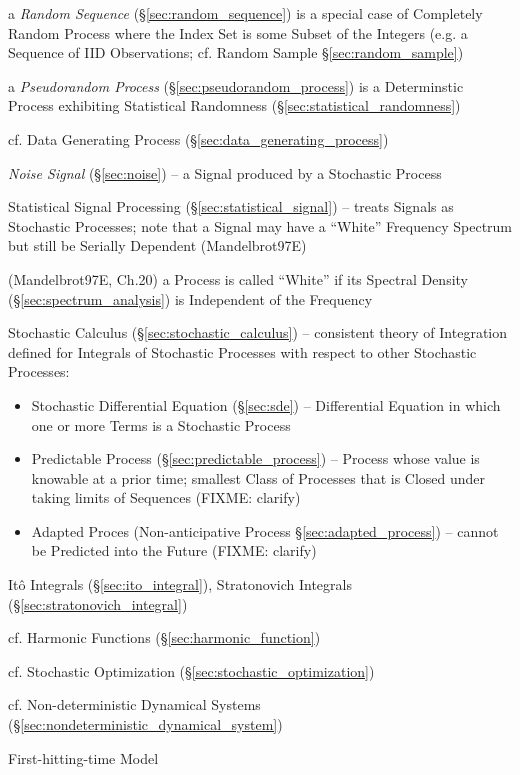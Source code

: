 \fist a \emph{Random Sequence} (\S\ref{sec:random_sequence}) is a special case
of Completely Random Process where the Index Set is some Subset of the Integers
(e.g. a Sequence of IID Observations; cf. Random Sample
\S\ref{sec:random_sample})

\fist a \emph{Pseudorandom Process} (\S\ref{sec:pseudorandom_process}) is a
Determinstic Process exhibiting Statistical Randomness
(\S\ref{sec:statistical_randomness})

\fist cf. Data Generating Process (\S\ref{sec:data_generating_process})

\fist \emph{Noise Signal} (\S\ref{sec:noise}) -- a Signal produced by a
Stochastic Process

\fist Statistical Signal Processing (\S\ref{sec:statistical_signal}) -- treats
Signals as Stochastic Processes;
note that a Signal may have a ``White'' Frequency Spectrum but still be Serially
Dependent (Mandelbrot97E)

(Mandelbrot97E, Ch.20) a Process is called ``White'' if its Spectral Density
(\S\ref{sec:spectrum_analysis}) is Independent of the Frequency

\fist Stochastic Calculus (\S\ref{sec:stochastic_calculus}) -- consistent theory
of Integration defined for Integrals of Stochastic Processes with respect to
other Stochastic Processes:
\begin{itemize}
  \item Stochastic Differential Equation (\S\ref{sec:sde}) -- Differential
    Equation in which one or more Terms is a Stochastic Process
  \item Predictable Process (\S\ref{sec:predictable_process}) -- Process whose
    value is knowable at a prior time; smallest Class of Processes that is
    Closed under taking limits of Sequences (FIXME: clarify)
  \item Adapted Proces (Non-anticipative Process \S\ref{sec:adapted_process}) --
    cannot be Predicted into the Future (FIXME: clarify)
\end{itemize}
It\^o Integrals (\S\ref{sec:ito_integral}), Stratonovich Integrals
(\S\ref{sec:stratonovich_integral})

cf. Harmonic Functions (\S\ref{sec:harmonic_function})

\fist cf. Stochastic Optimization (\S\ref{sec:stochastic_optimization})

\fist cf. Non-deterministic Dynamical Systems
(\S\ref{sec:nondeterministic_dynamical_system})

First-hitting-time Model

